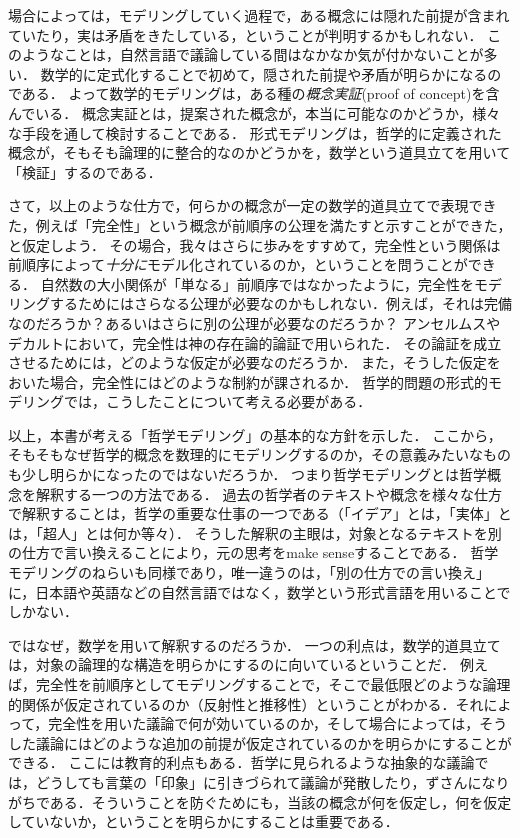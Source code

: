 \documentclass[11pt,a4paper]{jsarticle}
\begin{document}
場合によっては，モデリングしていく過程で，ある概念には隠れた前提が含まれていたり，実は矛盾をきたしている，ということが判明するかもしれない．
このようなことは，自然言語で議論している間はなかなか気が付かないことが多い．
数学的に定式化することで初めて，隠された前提や矛盾が明らかになるのである．
よって数学的モデリングは，ある種の\emph{概念実証}(proof of concept)を含んでいる．
概念実証とは，提案された概念が，本当に可能なのかどうか，様々な手段を通して検討することである．
形式モデリングは，哲学的に定義された概念が，そもそも論理的に整合的なのかどうかを，数学という道具立てを用いて「検証」するのである．

さて，以上のような仕方で，何らかの概念が一定の数学的道具立てで表現できた，例えば「完全性」という概念が前順序の公理を満たすと示すことができた，と仮定しよう．
その場合，我々はさらに歩みをすすめて，完全性という関係は前順序によって\emph{十分に}モデル化されているのか，ということを問うことができる．
自然数の大小関係が「単なる」前順序ではなかったように，完全性をモデリングするためにはさらなる公理が必要なのかもしれない．例えば，それは完備なのだろうか？あるいはさらに別の公理が必要なのだろうか？
アンセルムスやデカルトにおいて，完全性は神の存在論的論証で用いられた．
その論証を成立させるためには，どのような仮定が必要なのだろうか．
また，そうした仮定をおいた場合，完全性にはどのような制約が課されるか．
哲学的問題の形式的モデリングでは，こうしたことについて考える必要がある．

以上，本書が考える「哲学モデリング」の基本的な方針を示した．
ここから，そもそもなぜ哲学的概念を数理的にモデリングするのか，その意義みたいなものも少し明らかになったのではないだろうか．
つまり哲学モデリングとは哲学概念を解釈する一つの方法である．
過去の哲学者のテキストや概念を様々な仕方で解釈することは，哲学の重要な仕事の一つである（「イデア」とは，「実体」とは，「超人」とは何か等々）．
そうした解釈の主眼は，対象となるテキストを別の仕方で言い換えることにより，元の思考をmake senseすることである．
哲学モデリングのねらいも同様であり，唯一違うのは，「別の仕方での言い換え」に，日本語や英語などの自然言語ではなく，数学という形式言語を用いることでしかない．

ではなぜ，数学を用いて解釈するのだろうか．
一つの利点は，数学的道具立ては，対象の論理的な構造を明らかにするのに向いているということだ．
例えば，完全性を前順序としてモデリングすることで，そこで最低限どのような論理的関係が仮定されているのか（反射性と推移性）ということがわかる．それによって，完全性を用いた議論で何が効いているのか，そして場合によっては，そうした議論にはどのような追加の前提が仮定されているのかを明らかにすることができる．
ここには教育的利点もある．哲学に見られるような抽象的な議論では，どうしても言葉の「印象」に引きづられて議論が発散したり，ずさんになりがちである．そういうことを防ぐためにも，当該の概念が何を仮定し，何を仮定していないか，ということを明らかにすることは重要である．
\end{document}
